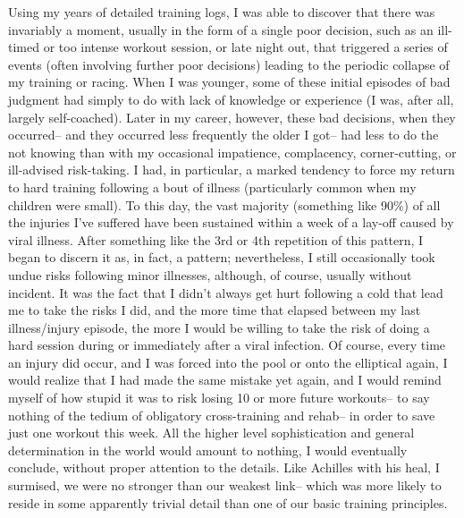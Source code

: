 Using my years of detailed training logs, I was able to discover that there was invariably a moment, usually in the form of a single poor decision, such as an ill-timed or too intense workout session, or late night out, that triggered a series of events (often involving further poor decisions) leading to the periodic collapse of my training or racing. When I was younger, some of these initial episodes of bad judgment had simply to do with lack of knowledge or experience (I was, after all, largely self-coached). Later in my career, however, these bad decisions, when they occurred-- and they occurred less frequently the older I got-- had less to do the not knowing than with my occasional impatience, complacency, corner-cutting, or ill-advised risk-taking. I had, in particular, a marked tendency to force my return to hard training following a bout of illness (particularly common when my children were small). To this day, the vast majority (something like 90\%) of all the injuries I've suffered have been sustained within a week of a lay-off caused by viral illness. After something like the 3rd or 4th repetition of this pattern, I began to discern it as, in fact, a pattern; nevertheless, I still occasionally took undue risks following minor illnesses, although, of course, usually without incident. It was the fact that I didn't always get hurt following a cold that lead me to take the risks I did, and the more time that elapsed between my last illness/injury episode, the more I would be willing to take the risk of doing a hard session during or immediately after a viral infection. Of course, every time an injury did occur, and I was forced into the pool or onto the elliptical again, I would realize that I had made the same mistake yet again, and I would remind myself of how stupid it was to risk losing 10 or more future workouts-- to say nothing of the tedium of obligatory cross-training and rehab-- in order to save just one workout this week. All the higher level sophistication and general determination in the world would amount to nothing, I would eventually conclude, without proper attention to the details. Like Achilles with his heal, I surmised, we were no stronger than our weakest link-- which was more likely to reside in some apparently trivial detail than one of our basic training principles.

